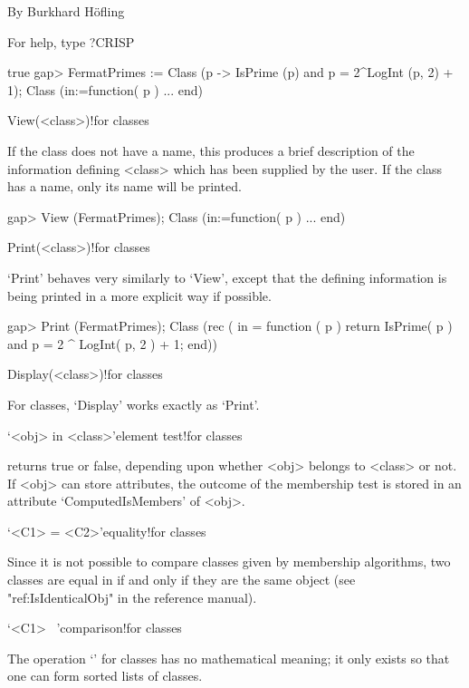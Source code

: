                 By Burkhard H\"ofling               
                                                    
                For help, type ?CRISP               
                                                    
true
gap> FermatPrimes := Class (p -> IsPrime (p) and p = 2^LogInt (p, 2) + 1); 
Class (in:=function( p ) ... end)
\endexample

\>View(<class>)!{for classes}

If the class does not have a name, this produces a brief description of the
information defining <class> which has been supplied by the user. If the
class has a name, only its name will be printed.

\begintt
gap> View (FermatPrimes);
Class (in:=function( p ) ... end)
\endtt

\>Print(<class>)!{for classes}

`Print' behaves very similarly to `View', except that the defining
information is being printed in a more explicit way if possible.

\begintt
gap> Print (FermatPrimes);
Class (rec ( in = function ( p )
    return IsPrime( p ) and p = 2 ^ LogInt( p, 2 ) + 1;
end))
\endtt


\>Display(<class>)!{for classes}

For classes, `Display' works exactly as `Print'.

\>`<obj> in <class>'{element test}!{for classes}

% 
%
returns true or false, depending upon whether <obj> belongs to <class> or
not. If <obj> can store attributes, the outcome of the membership test is
stored in an attribute `ComputedIsMembers' of <obj>.

\>`<C1> = <C2>'{equality!for classes}

Since it is not possible to compare classes given by membership algorithms,
two classes are equal in {\GAP} if and only if they are the same {\GAP}
object (see "ref:IsIdenticalObj" in the {\GAP} reference manual).

\>`<C1> \<\ <C2>'{comparison!for classes}

The operation `\<' for classes has no mathematical meaning; it only exists
so that one can form sorted lists of classes.


\null

